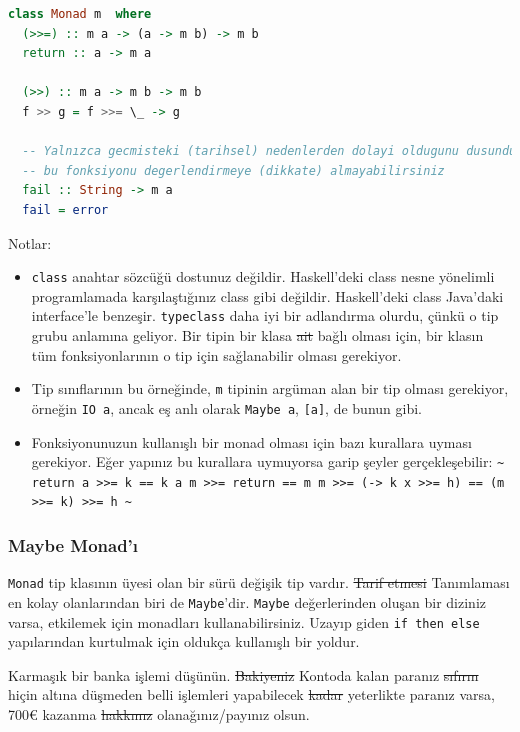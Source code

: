 \documentclass[a4paper,14pt,openany]{extbook} %
\newcommand{\euro}{€}
\begin{document}
\begin{lstlisting}[language=Haskell]
  class Monad m  where
  (>>=) :: m a -> (a -> m b) -> m b
  return :: a -> m a

  (>>) :: m a -> m b -> m b
  f >> g = f >>= \_ -> g

  -- Yalnızca gecmisteki (tarihsel) nedenlerden dolayi oldugunu dusundugum
  -- bu fonksiyonu degerlendirmeye (dikkate) almayabilirsiniz
  fail :: String -> m a
  fail = error
\end{lstlisting}
\pagebreak
  Notlar:
  \begin{itemize}
  \item \lstinline!class! anahtar sözcüğü dostunuz değildir.
  Haskell'deki class nesne yönelimli programlamada karşılaştığınız class
  gibi değildir. Haskell'deki class Java'daki interface'le benzeşir.
  \lstinline!typeclass! daha iyi bir adlandırma olurdu, çünkü o tip
  grubu anlamına geliyor. Bir tipin bir klasa \st{ait} bağlı olması için, bir
  klasın tüm fonksiyonlarının o tip için sağlanabilir olması gerekiyor.

  \item Tip sınıflarının bu örneğinde, \lstinline!m! tipinin argüman alan bir
  tip olması gerekiyor, örneğin \lstinline!IO a!, ancak eş anlı olarak
  \lstinline!Maybe a!, \lstinline![a]!, de bunun gibi.

  \item Fonksiyonunuzun kullanışlı
  bir monad olması için bazı kurallara uyması gerekiyor. Eğer yapınız bu
  kurallara uymuyorsa garip şeyler gerçekleşebilir:
  \lstinline!~ return a >>= k == k a m >>= return == m m >>= (-> k x >>= h) == (m >>= k) >>= h ~!
  \end{itemize}

\subsubsection{Maybe Monad'ı}\label{maybe-monadux131}

\lstinline!Monad! tip klasının üyesi olan bir sürü değişik tip vardır.
\st{Tarif etmesi} Tanımlaması en kolay olanlarından biri de \lstinline!Maybe!'dir. 
\lstinline!Maybe! değerlerinden oluşan bir diziniz varsa, etkilemek için
monadları kullanabilirsiniz. Uzayıp giden \lstinline!if then else  !
yapılarından kurtulmak için oldukça kullanışlı bir yoldur.

Karmaşık bir banka işlemi düşünün. \st{Bakiyeniz} Kontoda kalan paranız \st{sıfırın} hiçin altına
düşmeden belli işlemleri yapabilecek \st{kadar} yeterlikte paranız varsa, 700\euro{}
kazanma \st{hakkınız} olanağınız/payınız olsun.
\end{document}
